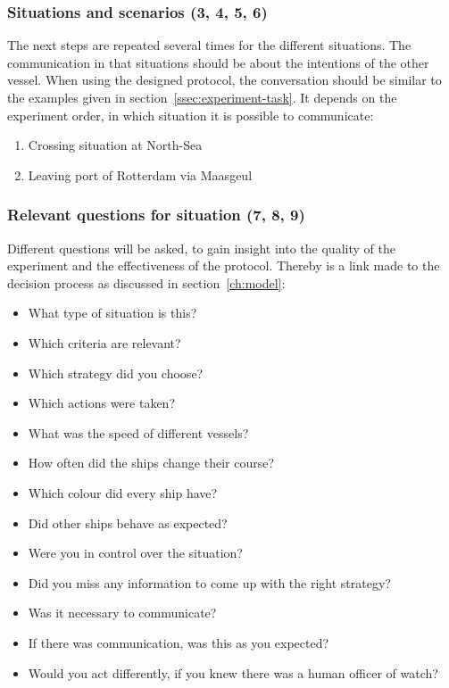 \subsubsection{Situations and scenarios (3, 4, 5, 6)}
The next steps are repeated several times for the different situations. The communication in that situations should be about the intentions of the other vessel. When using the designed protocol, the conversation should be similar to the examples given in section~\ref{ssec:experiment-task}. It depends on the experiment order, in which situation it is possible to communicate:
\begin{spacing}{1}
	\begin{enumerate}
		\item Crossing situation at North-Sea
		\item Leaving port of Rotterdam via Maasgeul
	\end{enumerate}
\end{spacing}

\subsubsection{Relevant questions for situation (7, 8, 9)}
Different questions will be asked, to gain insight into the quality of the experiment and the effectiveness of the protocol. Thereby is a link made to the decision process as discussed in section~\ref{ch:model}:
\begin{spacing}{1}
	\begin{itemize}
		\item What type of situation is this? \SA
		\item Which criteria are relevant? \performance
		\item Which strategy did you choose? \performance
		\item Which actions were taken? \performance
		\item What was the speed of different vessels? \SA
		\item How often did the ships change their course? \SA
		\item Which colour did every ship have? \SA
		\item Did other ships behave as expected? \SA \performance
		\item Were you in control over the situation? \performance \trust \satisfaction
		\item Did you miss any information to come up with the right strategy? \protocol \satisfaction
		\item Was it necessary to communicate? \SA \trust
		\item If there was communication, was this as you expected? \satisfaction
		\item Would you act differently, if you knew there was a human officer of watch? \trust \satisfaction
	\end{itemize}
\end{spacing}

